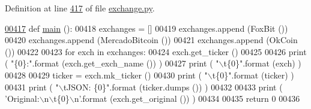 Definition at line \hyperlink{exchange_8py_source_l00417}{417} of file \hyperlink{exchange_8py_source}{exchange.\+py}.


\begin{DoxyCode}
\hypertarget{namespaceexchange.tex_l00417}{}\hyperlink{namespaceexchange_aa5b6297f878f52d360f5c42066aa097b}{00417} \textcolor{keyword}{def }\hyperlink{namespaceexchange_aa5b6297f878f52d360f5c42066aa097b}{main} ():
00418     exchanges = []
00419     exchanges.append (FoxBit ())
00420     exchanges.append (MercadoBitcoin ())
00421     exchanges.append (OkCoin ())
00422     
00423     \textcolor{keywordflow}{for} exch \textcolor{keywordflow}{in} exchanges:
00424         exch.get\_ticker ()
00425         
00426         \textcolor{keywordflow}{print} ( \textcolor{stringliteral}{"\{0\}:"}.format (exch.get\_exch\_name ()) )
00427         \textcolor{keywordflow}{print} ( \textcolor{stringliteral}{"\(\backslash\)t\{0\}"}.format (exch) )
00428         
00429         ticker = exch.mk\_ticker ()
00430         \textcolor{keywordflow}{print} ( \textcolor{stringliteral}{"\(\backslash\)t\{0\}"}.format (ticker) )
00431         \textcolor{keywordflow}{print} ( \textcolor{stringliteral}{"\(\backslash\)tJSON: \{0\}"}.format (ticker.dumps ()) )
00432         
00433         \textcolor{keywordflow}{print} ( \textcolor{stringliteral}{'Original:\(\backslash\)n\(\backslash\)t\{0\}\(\backslash\)n'}.format (exch.get\_original ()) )
00434     
00435     \textcolor{keywordflow}{return} 0
00436     
\end{DoxyCode}
